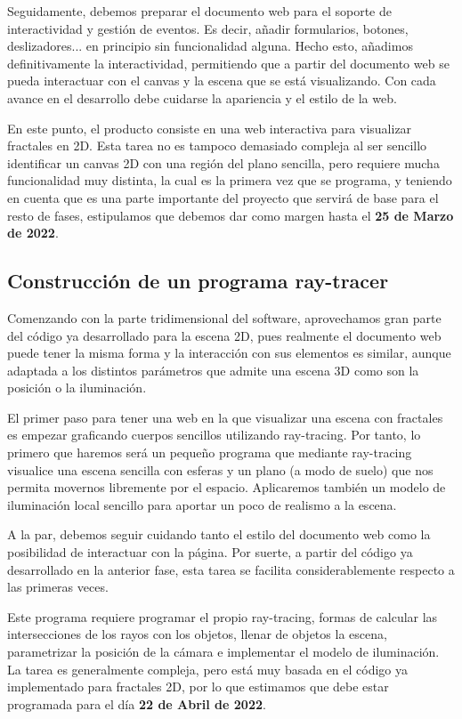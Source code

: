 Seguidamente, debemos preparar el documento web para el soporte de interactividad y gestión de eventos. Es decir, añadir formularios, botones, deslizadores... en principio sin funcionalidad alguna. Hecho esto, añadimos definitivamente la interactividad, permitiendo que a partir del documento web se pueda interactuar con el canvas y la escena que se está visualizando. Con cada avance en el desarrollo debe cuidarse la apariencia y el estilo de la web.

En este punto, el producto consiste en una web interactiva para visualizar fractales en 2D. Esta tarea no es tampoco demasiado compleja al ser sencillo identificar un canvas 2D con una región del plano sencilla, pero requiere mucha funcionalidad muy distinta, la cual es la primera vez que se programa, y teniendo en cuenta que es una parte importante del proyecto que servirá de base para el resto de fases, estipulamos que debemos dar como margen hasta el \textbf{25 de Marzo de 2022}.

\subsection*{Construcción de un programa ray-tracer}

Comenzando con la parte tridimensional del software, aprovechamos gran parte del código ya desarrollado para la escena 2D, pues realmente el documento web puede tener la misma forma y la interacción con sus elementos es similar, aunque adaptada a los distintos parámetros que admite una escena 3D como son la posición o la iluminación.

El primer paso para tener una web en la que visualizar una escena con fractales es empezar graficando cuerpos sencillos utilizando ray-tracing. Por tanto, lo primero que haremos será un pequeño programa que mediante ray-tracing visualice una escena sencilla con esferas y un plano (a modo de suelo) que nos permita movernos libremente por el espacio. Aplicaremos también un modelo de iluminación local sencillo para aportar un poco de realismo a la escena.

A la par, debemos seguir cuidando tanto el estilo del documento web como la posibilidad de interactuar con la página. Por suerte, a partir del código ya desarrollado en la anterior fase, esta tarea se facilita considerablemente respecto a las primeras veces.

Este programa requiere programar el propio ray-tracing, formas de calcular las intersecciones de los rayos con los objetos, llenar de objetos la escena, parametrizar la posición de la cámara e implementar el modelo de iluminación. La tarea es generalmente compleja, pero está muy basada en el código ya implementado para fractales 2D, por lo que estimamos que debe estar programada para el día \textbf{22 de Abril de 2022}.

